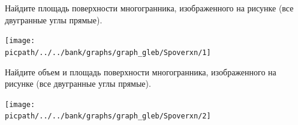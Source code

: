 \begin{homework}[number=4]
\begin{listofex}
		\item 
		\begin{minipage}[t]{\bodywidth}
			Найдите площадь поверхности многогранника, изображенного на рисунке (все двугранные углы прямые).
		\end{minipage}
		\hspace{0.02\linewidth}
		\begin{minipage}[t]{\picwidth}
			\texttt{[image: \\picpath/../../bank/graphs/graph\_gleb/Spoverxn/1]}
		\end{minipage}
	
	\item 
	\begin{minipage}[t]{\bodywidth}
		Найдите объем и площадь поверхности многогранника, изображенного на рисунке (все двугранные углы прямые).
	\end{minipage}
	\hspace{0.02\linewidth}
	\begin{minipage}[t]{\picwidth}
		\texttt{[image: \\picpath/../../bank/graphs/graph\_gleb/Spoverxn/2]}
	\end{minipage}
\end{listofex}
\end{homework}
